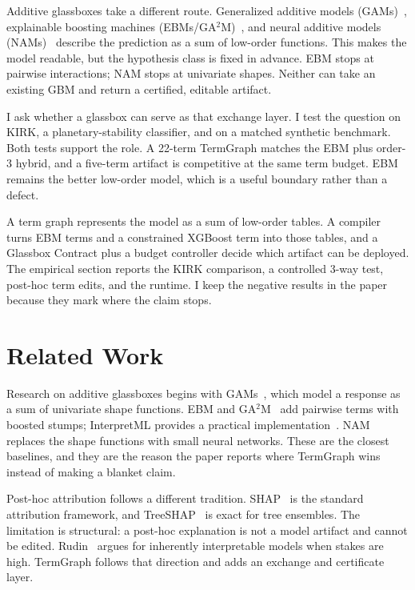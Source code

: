\documentclass[twoside,11pt]{article}
\begin{document}
Additive glassboxes take a different route. Generalized additive models
(GAMs)~\citep{hastie1990gam}, explainable boosting machines
(EBMs/GA$^2$M)~\citep{lou2012intelligible,lou2013accurate}, and neural additive
models (NAMs)~\citep{agarwal2021nam} describe the prediction as a sum of
low-order functions. This makes the model readable, but the hypothesis class is
fixed in advance. EBM stops at pairwise interactions; NAM stops at univariate
shapes. Neither can take an existing GBM and return a certified, editable
artifact.

I ask whether a glassbox can serve as that exchange layer. I test the question
on KIRK, a planetary-stability classifier, and on a matched synthetic benchmark.
Both tests support the role. A 22-term TermGraph matches the EBM plus order-3
hybrid, and a five-term artifact is competitive at the same term budget. EBM
remains the better low-order model, which is a useful boundary rather than a
defect.

A term graph represents the model as a sum of low-order tables. A compiler turns
EBM terms and a constrained XGBoost term into those tables, and a Glassbox
Contract plus a budget controller decide which artifact can be deployed. The
empirical section reports the KIRK comparison, a controlled 3-way test, post-hoc
term edits, and the runtime. I keep the negative results in the paper because
they mark where the claim stops.

\section{Related Work}

Research on additive glassboxes begins with GAMs~\citep{hastie1990gam}, which
model a response as a sum of univariate shape functions. EBM and
GA$^2$M~\citep{lou2012intelligible,lou2013accurate} add pairwise terms with
boosted stumps; InterpretML provides a practical
implementation~\citep{nori2019interpretml}. NAM~\citep{agarwal2021nam} replaces the
shape functions with small neural networks. These are the closest baselines, and
they are the reason the paper reports where TermGraph wins instead of making a
blanket claim.

Post-hoc attribution follows a different tradition. SHAP~\citep{lundberg2017shap}
is the standard attribution framework, and TreeSHAP~\citep{lundberg2020tree} is
exact for tree ensembles. The limitation is structural: a post-hoc explanation
is not a model artifact and cannot be edited. Rudin~\citep{rudin2019stop} argues
for inherently interpretable models when stakes are high. TermGraph follows that
direction and adds an exchange and certificate layer.
\end{document}
